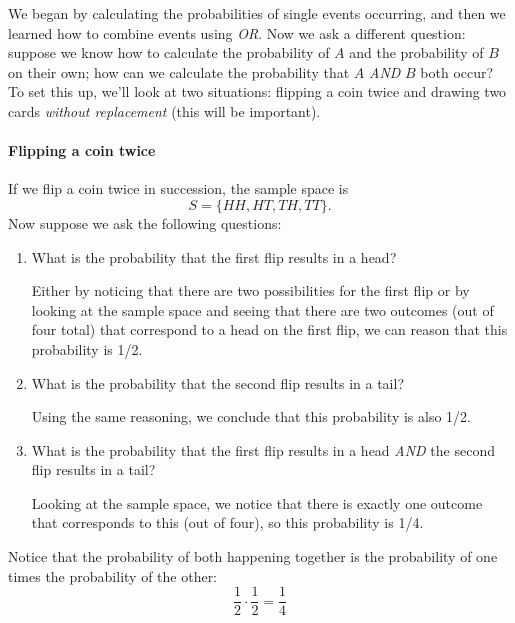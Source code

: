 \setcounter{ExampleCounter}{1}
We began by calculating the probabilities of single events occurring, and then we learned how to combine events using \emph{OR}.  Now we ask a different question: suppose we know how to calculate the probability of $A$ and the probability of $B$ on their own; how can we calculate the probability that $A$ \emph{AND} $B$ both occur?  To set this up, we'll look at two situations: flipping a coin twice and drawing two cards \emph{without replacement} (this will be important).

\paragraph{Flipping a coin twice} If we flip a coin twice in succession, the sample space is \[S=\{HH, HT, TH, TT\}.\]  Now suppose we ask the following questions:
\begin{enumerate}
\item What is the probability that the first flip results in a head?
\begin{center}
Either by noticing that there are two possibilities for the first flip or by looking at the sample space and seeing that there are two outcomes (out of four total) that correspond to a head on the first flip, we can reason that this probability is 1/2.
\end{center} 
\item What is the probability that the second flip results in a tail?
\begin{center}
Using the same reasoning, we conclude that this probability is also 1/2.
\end{center} 
\item What is the probability that the first flip results in a head \emph{AND} the second flip results in a tail?
\begin{center}
Looking at the sample space, we notice that there is exactly one outcome that corresponds to this (out of four), so this probability is 1/4.
\end{center}
\end{enumerate}

Notice that the probability of both happening together is the probability of one times the probability of the other:
\[\dfrac{1}{2} \cdot \dfrac{1}{2} = \dfrac{1}{4}\]

